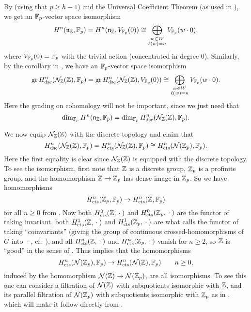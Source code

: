 By \cite[§2.10]{PT} (using that $p \geq h-1$) and the Universal Coefficient Theorem (as used in \cite[§3.8]{PT}), we get an $\mathbb{F}_{p}$-vector space isomorphism
\begin{equation*}
  H^{n}(\mathfrak{n}_{\mathbb{Z}},\mathbb{F}_{p}) = H^{n}(\mathfrak{n}_{\mathbb{Z}},V_{\mathbb{F}_p}(0)) \cong \bigoplus_{\substack{w \in W \\ \ell(w) = n}} V_{\mathbb{F}_p}(w \cdot 0),
\end{equation*}
where $V_{\mathbb{F}_{p}}(0) = \mathbb{F}_{p}$ with the trivial action (concentrated in degree $0$). Similarly, by the corollary in \cite[§3.8]{PT}, we have an $\mathbb{F}_{p}$-vector space isomorphism
\begin{equation*}
  \operatorname{gr} H_{\mathrm{dsc}}^{n}(\mathcal{N}_{\mathbb{Z}}(\mathbb{Z}),\mathbb{F}_{p}) = \operatorname{gr} H_{\mathrm{dsc}}^{n}(\mathcal{N}_{\mathbb{Z}}(\mathbb{Z}),V_{\mathbb{F}_p}(0)) \cong \bigoplus_{\substack{w \in W \\ \ell(w) = n}} V_{\mathbb{F}_p}(w \cdot 0).
\end{equation*}
Here the grading on cohomology will not be important, since we just need that
\begin{equation}
  \label{eq:PT-dims}
  \dim_{\mathbb{F}_{p}} H^{n}(\mathfrak{n}_{\mathbb{Z}},\mathbb{F}_{p}) = \dim_{\mathbb{F}_{p}} H_{\mathrm{dsc}}^{n}(\mathcal{N}_{\mathbb{Z}}(\mathbb{Z}),\mathbb{F}_{p}).
\end{equation}

We now equip $\mathcal{N}_{\mathbb{Z}}(\mathbb{Z})$ with the discrete topology and claim that
\begin{equation*}
  H_{\mathrm{dsc}}^{n}(\mathcal{N}_{\mathbb{Z}}(\mathbb{Z}),\mathbb{F}_{p}) = H_{\mathrm{cts}}^{n}(\mathcal{N}_{\mathbb{Z}}(\mathbb{Z}),\mathbb{F}_{p}) \cong H_{\mathrm{cts}}^{n}(\mathcal{N}(\mathbb{Z}_p),\mathbb{F}_{p}).
\end{equation*}
Here the first equality is clear since $\mathcal{N}_{\mathbb{Z}}(\mathbb{Z})$ is equipped with the discrete topology. To see the isomorphism, first note that $\mathbb{Z}$ is a discrete group, $\mathbb{Z}_p$ is a profinite group, and the homomorphism $\mathbb{Z} \to \mathbb{Z}_p$ has dense image in $\mathbb{Z}_p$. So we have homomorphisms
\begin{equation*}
  H_{\mathrm{cts}}^n(\mathbb{Z}_p,\mathbb{F}_p) \to H_{\mathrm{cts}}^n(\mathbb{Z},\mathbb{F}_p)
\end{equation*}
for all $n\geq0$ from \cite[Sect.~I~§2.6]{GalCoh}. Now both $H_{\mathrm{cts}}^0(\mathbb{Z},\:\cdot\:)$ and $H_{\mathrm{cts}}^0(\mathbb{Z}_p,\:\cdot\:)$ are the functor of taking invariant, both $H_{\mathrm{cts}}^1(\mathbb{Z},\:\cdot\:)$ and $H_{\mathrm{cts}}^1(\mathbb{Z}_p,\:\cdot\:)$ are what \cite{GK} calls the functor of taking ``coinvariants'' (giving the group of continuous crossed-homomorphisms of $G$ into $\:\cdot\:$, cf.\ \cite[I.~§2]{GalCoh}), and all $H_{\mathrm{cts}}^n(\mathbb{Z},\:\cdot\:)$ and $H_{\mathrm{cts}}^n(\mathbb{Z}_p,\:\cdot\:)$ vanish for $n\geq2$, so $\mathbb{Z}$ is \enquote{good} in the sense of \cite[Section~I~§2.6 Exercise~2]{GalCoh}. Thus \cite[Section~I~§2.6 Exercise~2(d)]{GalCoh} implies that the homomorphisms
\begin{equation*}
  H_{\mathrm{cts}}^n(\mathcal{N}(\mathbb{Z}_p),\mathbb{F}_p) \to H_{\mathrm{cts}}^n(\mathcal{N}(\mathbb{Z}),\mathbb{F}_p) \qquad n\geq0,
\end{equation*}
induced by the homomorphism $\mathcal{N}(\mathbb{Z}) \to \mathcal{N}(\mathbb{Z}_p)$, are all isomorphisms. To see this one can consider a filtration of $\mathcal{N}(\mathbb{Z})$ with subquotients isomorphic with $\mathbb{Z}$, and its parallel filtration of $\mathcal{N}(\mathbb{Z}_p)$ with subquotients isomorphic with $\mathbb{Z}_p$ as in \cite[Sect.~7]{GK}, which will make it follow directly from \cite[Section~I~§2.6 Exercise~2(d)]{GalCoh}.

